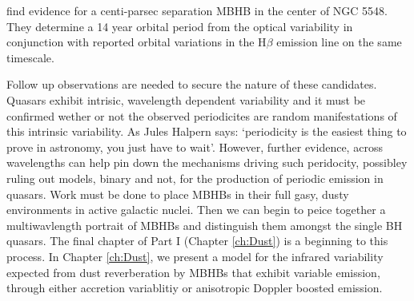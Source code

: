 \citep{LiWang:2016} find evidence for a centi-parsec separation MBHB in the
center of NGC 5548. They determine a 14 year orbital period from the optical
variability in conjunction with reported orbital variations in the H$\beta$
emission line on the same timescale.



Follow up observations are needed to secure the nature of these candidates.
Quasars exhibit intrisic, wavelength dependent variability
\citep{Kelly:2009:DRW,Kozlowski+2010} and it must be confirmed wether or not
the observed periodicites are random manifestations of this intrinsic
variability. As Jules Halpern says: `periodicity is the easiest thing to prove
in astronomy, you just have to wait'. However, further evidence, across
wavelengths can help pin down the mechanisms driving such peridocity,
possibley ruling out models, binary and not, for the production of periodic
emission in quasars. Work must be done to place MBHBs in their full gasy,
dusty environments in active galactic nuclei. Then we can begin to peice
together a multiwavlength portrait of MBHBs and distinguish them amongst the
single BH quasars. The final chapter of Part I (Chapter \ref{ch:Dust}) is a
beginning to this process. In Chapter \ref{ch:Dust}, we present a model for
the infrared variability expected from dust reverberation by MBHBs that
exhibit variable emission, through either accretion variablitiy or anisotropic
Doppler boosted emission.









	
	


